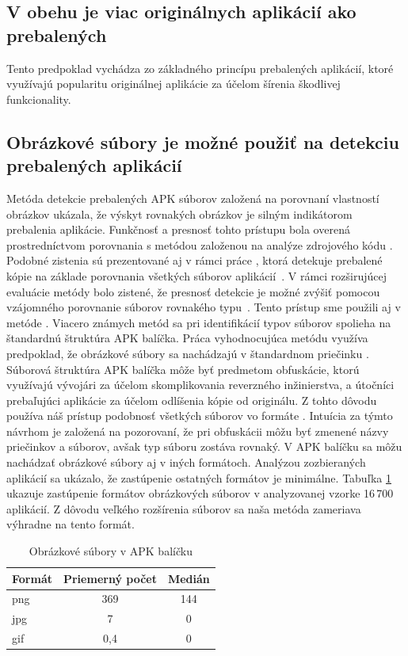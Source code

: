 \subsection*{V obehu je viac originálnych aplikácií ako prebalených}
Tento predpoklad vychádza zo základného princípu prebalených aplikácií, ktoré využívajú popularitu originálnej aplikácie za účelom šírenia škodlivej funkcionality.

\subsection*{Obrázkové súbory je možné použiť na detekciu prebalených aplikácií}
Metóda detekcie prebalených APK súborov  založená na porovnaní vlastností obrázkov ukázala, že výskyt rovnakých obrázkov je silným indikátorom prebalenia aplikácie. Funkčnosť a presnosť tohto prístupu bola overená prostredníctvom porovnania s metódou založenou na analýze zdrojového kódu \cite{ImageStruct}. Podobné zistenia sú prezentované aj v rámci práce , ktorá detekuje prebalené kópie na základe porovnania všetkých súborov aplikácií~\cite{Zhauniarovich2014}. V rámci rozširujúcej evaluácie metódy  bolo zistené, že presnosť detekcie je možné zvýšiť pomocou vzájomného porovnanie súborov rovnakého typu~\cite{Gadyatskaya2016}. Tento prístup sme použili aj v metóde . Viacero známych metód sa pri identifikácií typov súborov spolieha na štandardnú štruktúra APK balíčka. Práca vyhodnocujúca metódu  využíva predpoklad, že obrázkové súbory sa nachádzajú v štandardnom priečinku . Súborová štruktúra APK balíčka môže byť predmetom obfuskácie, ktorú využívajú vývojári za účelom skomplikovania reverzného inžinierstva, a útočníci prebaľujúci aplikácie za účelom odlíšenia kópie od originálu. Z tohto dôvodu používa náš prístup podobnosť všetkých súborov vo formáte . Intuícia za týmto návrhom je založená na pozorovaní, že pri obfuskácii môžu byť zmenené názvy priečinkov a súborov, avšak typ súboru zostáva rovnaký. V APK balíčku sa môžu nachádzať obrázkové súbory aj v iných formátoch. Analýzou zozbieraných aplikácií sa ukázalo, že zastúpenie ostatných formátov je minimálne. Tabuľka \ref{images-apk} ukazuje zastúpenie formátov obrázkových súborov v analyzovanej vzorke 16\,700 aplikácií. Z dôvodu veľkého rozšírenia  súborov sa naša metóda zameriava výhradne na tento formát.
\begin{table}[]
\centering
\label{images-apk}
\begin{tabular}{|l|c|c|}
\hline
\textbf{Formát} & \textbf{Priemerný počet}  & \textbf{Medián}         \\ \hline
png             & 369                       & 144         \\
jpg             & 7                         & 0                 \\
gif             & 0,4                       & 0             \\
\hline
\end{tabular}
\caption{Obrázkové súbory v APK balíčku}
\end{table}

